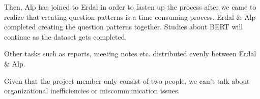 \documentclass{mefsdp}
\begin{document}
	Then, Alp has joined to Erdal in order to fasten up the process after we came to realize that creating question patterns is a time consuming process. Erdal \& Alp completed creating the question patterns together. Studies about BERT will continue as the dataset gets completed.\newline \par
	
	Other tasks such as reports, meeting notes etc. distributed evenly between Erdal \& Alp.\newline \par
	
	Given that the project member only consist of two people, we can't talk about organizational inefficiencies or miscommunication issues. 
	
	\begin{appendix}[A]
	\end{appendix}

	
	
	
\end{document}
